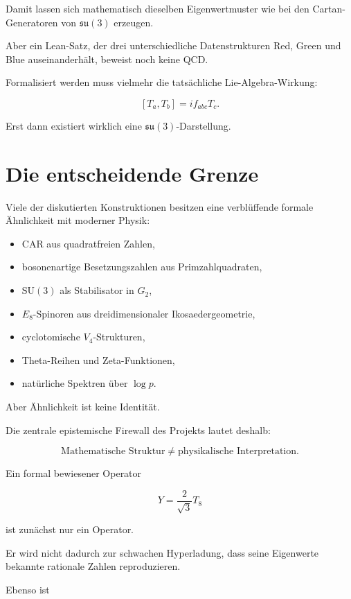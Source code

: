 \documentclass[11pt,a4paper]{article}
\begin{document}
Damit lassen sich mathematisch dieselben Eigenwertmuster wie bei den Cartan-Generatoren von \(\mathfrak{su}(3)\) erzeugen.


Aber ein Lean-Satz, der drei unterschiedliche Datenstrukturen Red, Green und Blue auseinanderhält, beweist noch keine QCD.


Formalisiert werden muss vielmehr die tatsächliche Lie-Algebra-Wirkung:


\[
[T_a,T_b]
=
if_{abc}T_c.
\]


Erst dann existiert wirklich eine \(\mathfrak{su}(3)\)-Darstellung.





\section{Die entscheidende Grenze}


Viele der diskutierten Konstruktionen besitzen eine verblüffende formale Ähnlichkeit mit moderner Physik:


\begin{itemize}[leftmargin=*]
\item CAR aus quadratfreien Zahlen,
\item bosonenartige Besetzungszahlen aus Primzahlquadraten,
\item \(\mathrm{SU}(3)\) als Stabilisator in \(G_2\),
\item \(E_8\)-Spinoren aus dreidimensionaler Ikosaedergeometrie,
\item cyclotomische \(V_4\)-Strukturen,
\item Theta-Reihen und Zeta-Funktionen,
\item natürliche Spektren über \(\log p\).
\end{itemize}

Aber Ähnlichkeit ist keine Identität.


Die zentrale epistemische Firewall des Projekts lautet deshalb:


\[
\boxed{
\text{Mathematische Struktur}
\neq
\text{physikalische Interpretation}.
}
\]


Ein formal bewiesener Operator


\[
Y=\frac{2}{\sqrt{3}}T_8
\]


ist zunächst nur ein Operator.


Er wird nicht dadurch zur schwachen Hyperladung, dass seine Eigenwerte bekannte rationale Zahlen reproduzieren.


Ebenso ist
\end{document}
